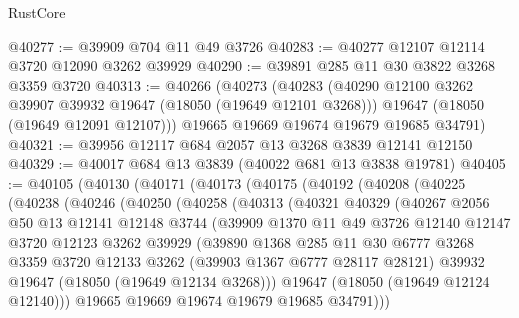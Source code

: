 \begin{lexlean}{RustCore}
\begin{coremodule}
@40277 := @39909 @704 @11 @49 @3726
@40283 := @40277 @12107 @12114 @3720 @12090 @3262 @39929
@40290 := @39891 @285 @11 @30 @3822 @3268 @3359 @3720
@40313 := @40266
    (@40273
      (@40283
        (@40290 @12100 @3262 @39907 @39932 @19647 (@18050 (@19649 @12101 @3268)))
        @19647
        (@18050 (@19649 @12091 @12107)))
      @19665
      @19669
      @19674
      @19679
      @19685
      @34791)
@40321 := @39956 @12117 @684 @2057 @13 @3268 @3839 @12141 @12150
@40329 := @40017 @684 @13 @3839 (@40022 @681 @13 @3838 @19781)
@40405 := @40105
    (@40130
      (@40171
        (@40173
          (@40175
            (@40192
              (@40208
                (@40225
                  (@40238
                    (@40246
                      (@40250
                        (@40258
                          (@40313
                            (@40321
                              @40329
                              (@40267
                                @2056
                                @50
                                @13
                                @12141
                                @12148
                                @3744
                                (@39909
                                  @1370
                                  @11
                                  @49
                                  @3726
                                  @12140
                                  @12147
                                  @3720
                                  @12123
                                  @3262
                                  @39929
                                  (@39890
                                    @1368
                                    @285
                                    @11
                                    @30
                                    @6777
                                    @3268
                                    @3359
                                    @3720
                                    @12133
                                    @3262
                                    (@39903 @1367 @6777 @28117 @28121)
                                    @39932
                                    @19647
                                    (@18050 (@19649 @12134 @3268)))
                                  @19647
                                  (@18050 (@19649 @12124 @12140)))
                                @19665
                                @19669
                                @19674
                                @19679
                                @19685
                                @34791)))

\end{coremodule}
\end{lexlean}
